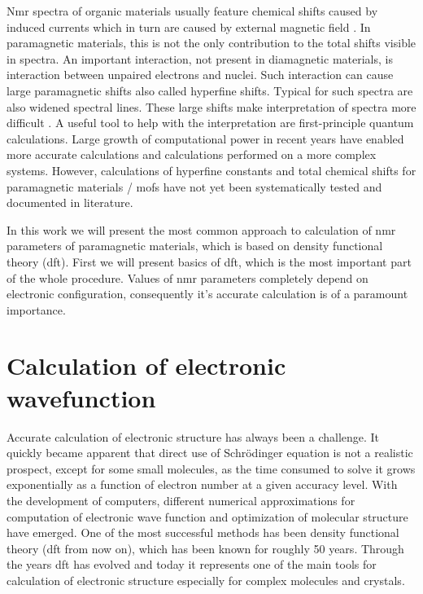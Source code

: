 \documentclass[openany, longbibliography,slovene,a4paper,12pt]{article}
\begin{document}
 Nmr spectra of organic materials usually feature chemical shifts caused by
 induced currents which in turn are caused by external magnetic field
 \cite{chemic_shift_tensor_review}. In paramagnetic materials, this is not the
 only contribution to the total shifts visible in spectra. An important
 interaction, not present in  diamagnetic materials, is interaction between
 unpaired electrons and nuclei. Such interaction can cause large paramagnetic
 shifts also called hyperfine shifts. Typical for such spectra are also widened
 spectral lines. These large shifts make interpretation of spectra more difficult
 \cite{Dft_Investigation_of_the_Effect_of_Spin_Orbit}. A useful tool to help
 with the interpretation are first-principle quantum calculations. Large growth
 of computational power in recent years have enabled more accurate calculations
 and calculations performed on a more complex systems. However, calculations of
 hyperfine constants and total chemical shifts for paramagnetic materials / mofs
 have not yet been systematically tested and documented in literature.

 In this work we will present the most common approach to calculation of nmr
 parameters of paramagnetic materials,  which is based on density functional
 theory (dft). First we  will present basics of dft, which is the most important part of the whole procedure. Values of nmr parameters completely depend on electronic configuration, consequently it's accurate calculation is of a paramount importance. 

\section{Calculation of electronic wavefunction}
Accurate calculation of electronic structure has always been a challenge. It
quickly became apparent that direct use of Schr{\"o}dinger equation is not a
realistic prospect, except for some small
molecules, as the time consumed to solve it grows exponentially
\cite{nobel_lecture} as a function of electron
number at a given accuracy level. With the development of computers, different
numerical approximations for computation of electronic wave function and
optimization of molecular structure have emerged. One of the most successful methods has been density functional theory
(dft from now on), which has been known for roughly 50 years. Through the years dft has evolved and today it represents one of the main tools for calculation of electronic structure especially for complex molecules and crystals.
\end{document}
